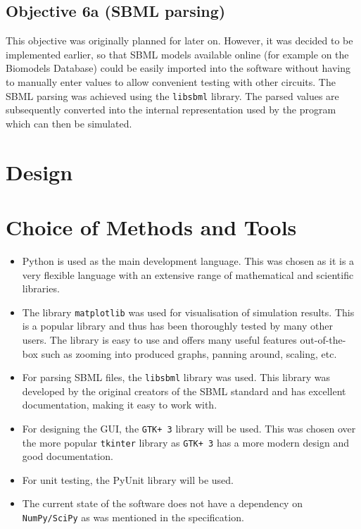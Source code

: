 \documentclass{article}
\begin{document}
	\subsection{Objective 6a (SBML parsing)} 
	This objective was originally planned for later on. However, it was decided to be implemented earlier, so that SBML models available online (for example on the Biomodels Database) could be easily imported into the software without having to manually enter values to allow convenient testing with other circuits. The SBML parsing was achieved using the \verb|libsbml| library. The parsed values are subsequently converted into the internal representation used by the program which can then be simulated. 
	
	
	\section{Design}		%
	
	\section{Choice of Methods and Tools}
	\begin{itemize}
		\item Python is used as the main development language. This was chosen as it is a very flexible language with an extensive range of mathematical and scientific libraries.
		\item The library \verb|matplotlib| was used for visualisation of simulation results. This is a popular library and thus has been thoroughly tested by many other users. The library is easy to use and offers many useful features out-of-the-box such as zooming into produced graphs, panning around, scaling, etc.
		\item For parsing SBML files, the \verb|libsbml| library was used. This library was developed by the original creators of the SBML standard and has excellent documentation, making it easy to work with.
		\item For designing the GUI, the \verb|GTK+ 3| library will be used. This was chosen over the more popular \verb|tkinter| library as \verb|GTK+ 3| has a more modern design and good documentation.
		\item For unit testing, the PyUnit library will be used.
		\item The current state of the software does not have a dependency on \verb|NumPy/SciPy| as was mentioned in the specification.
	\end{itemize}
	
\end{document}
